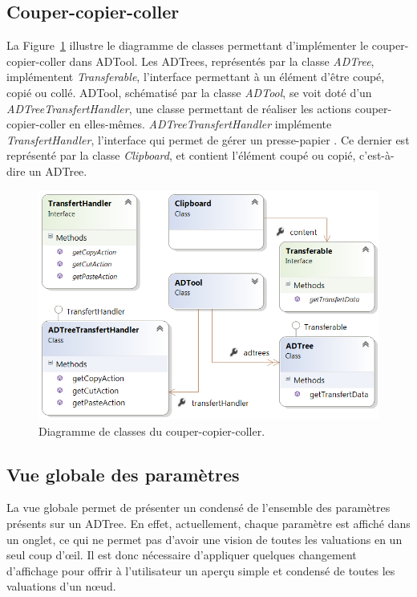     \subsection{Couper-copier-coller}
		La {\sc Figure}~{\ref{fig:copiercoller}} illustre le diagramme de classes permettant d'implémenter le couper-copier-coller dans ADTool. Les ADTrees, représentés par la classe \emph{ADTree}, implémentent \emph{Transferable}, l'interface permettant à un élément d'être coupé, copié ou collé. ADTool, schématisé par la classe \emph{ADTool}, se voit doté d'un \emph{ADTreeTransfertHandler}, une classe permettant de réaliser les actions couper-copier-coller en elles-mêmes. \emph{ADTreeTransfertHandler} implémente \emph{TransfertHandler}, l'interface qui permet de gérer un \og presse-papier \fg{}. Ce dernier est représenté par la classe \emph{Clipboard}, et contient l'élément coupé ou copié, c'est-à-dire un ADTree.
    	
    	\begin{figure}[H]
	        \centering
	        \includegraphics[height=0.6\textwidth]{figure/copiercoller.png}
	        \caption{Diagramme de classes du couper-copier-coller.}
	        \label{fig:copiercoller}
	    \end{figure}
	    
	\subsection{Vue globale des paramètres}

		 La vue globale permet de présenter un condensé de l'ensemble des paramètres présents sur un ADTree. En effet, actuellement, chaque paramètre est affiché dans un onglet, ce qui ne permet pas d'avoir une vision de toutes les valuations en un seul coup d'œil. Il est donc nécessaire d'appliquer quelques changement d'affichage pour offrir à l'utilisateur un aperçu simple et condensé de toutes les valuations d'un nœud.
	
